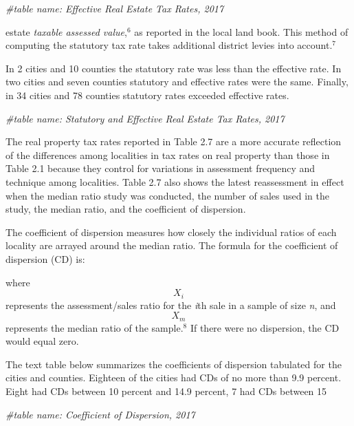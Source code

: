 \documentclass[
]{book}
\newenvironment{Shaded}{\begin{snugshade}}{\end{snugshade}}
\newcommand{\CommentTok}[1]{\textcolor[rgb]{0.56,0.35,0.01}{\textit{#1}}}
\begin{document}
\begin{Shaded}
\begin{Highlighting}[]
\CommentTok{\#table name: Effective Real Estate Tax Rates, 2017}
\end{Highlighting}
\end{Shaded}

estate \emph{taxable assessed value},\(^6\) as reported in the local land book. This method of computing the statutory tax rate takes additional district levies into account.\(^7\)

In 2 cities and 10 counties the statutory rate was less than the effective rate. In two cities and seven counties statutory and effective rates were the same. Finally, in 34 cities and 78 counties statutory rates exceeded effective rates.

\begin{Shaded}
\begin{Highlighting}[]
\CommentTok{\#table name: Statutory and Effective Real Estate Tax Rates, 2017}
\end{Highlighting}
\end{Shaded}

The real property tax rates reported in Table 2.7 are a more accurate reflection of the differences among localities in tax rates on real property than those in Table 2.1 because they control for variations in assessment frequency and technique among localities. Table 2.7 also shows the latest reassessment in effect when the median ratio study was conducted, the number of sales used in the study, the median ratio, and the coefficient of dispersion.

The coefficient of dispersion measures how closely the individual ratios of each locality are arrayed around the median ratio. The formula for the coefficient of dispersion (CD) is:

where \[X_i\] represents the assessment/sales ratio for the \emph{i}th sale in a sample of size \emph{n}, and \[X_m\] represents the median ratio of the sample.\(^8\) If there were no dispersion, the CD would equal zero.

The text table below summarizes the coefficients of dispersion tabulated for the cities and counties. Eighteen of the cities had CDs of no more than 9.9 percent. Eight had CDs between 10 percent and 14.9 percent, 7 had CDs between 15

\begin{Shaded}
\begin{Highlighting}[]
\CommentTok{\#table name: Coefficient of Dispersion, 2017}
\end{Highlighting}
\end{Shaded}
\end{document}
